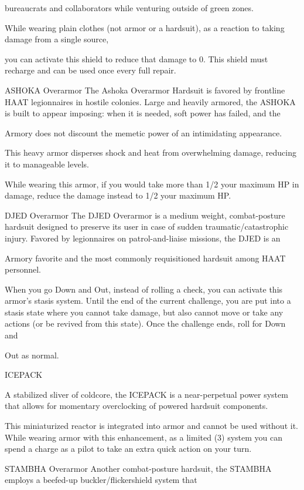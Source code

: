 bureaucrats and collaborators while venturing outside of green zones.

While wearing plain clothes (not armor or a hardsuit), as a reaction to taking damage from a single source,

you can activate this shield to reduce that damage to 0. This shield must recharge and can be used once
every full repair.


ASHOKA Overarmor
The Ashoka Overarmor Hardsuit is favored by frontline HAAT legionnaires in hostile colonies. Large and
heavily armored, the ASHOKA is built to appear imposing: when it is needed, soft power has failed, and the

Armory does not discount the memetic power of an intimidating appearance.

This heavy armor disperses shock and heat from overwhelming damage, reducing it to manageable levels.

While wearing this armor, if you would take more than 1/2 your maximum HP in damage, reduce the
damage instead to 1/2 your maximum HP.


DJED Overarmor
The DJED Overarmor is a medium weight, combat-posture hardsuit designed to preserve its user in case of
sudden traumatic/catastrophic injury. Favored by legionnaires on patrol-and-liaise missions, the DJED is an

Armory favorite and the most commonly requisitioned hardsuit among HAAT personnel.




When you go Down and Out, instead of rolling a check, you can activate this armor’s stasis system. Until
the end of the current challenge, you are put into a stasis state where you cannot take damage, but also
cannot move or take any actions (or be revived from this state). Once the challenge ends, roll for Down and

Out as normal.


ICEPACK

A stabilized sliver of coldcore, the ICEPACK is a near-perpetual power system that allows for momentary
overclocking of powered hardsuit components.

This miniaturized reactor is integrated into armor and cannot be used without it. While wearing armor with
this enhancement, as a limited (3) system you can spend a charge as a pilot to take an extra quick action
on your turn.


STAMBHA Overarmor
Another combat-posture hardsuit, the STAMBHA employs a beefed-up buckler/flickershield system that


